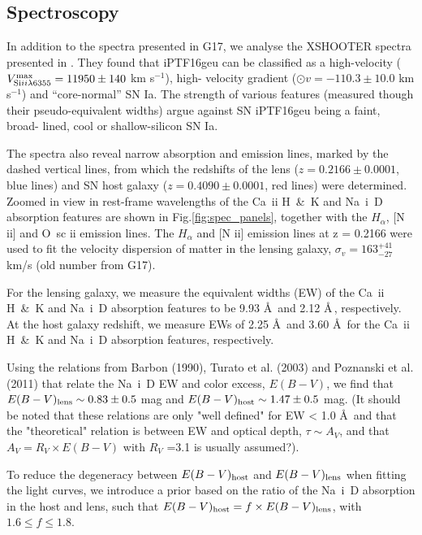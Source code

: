 \documentclass[a4paper,fleqn,usenatbib]{mnras}
\newcommand{\geu}{iPTF16geu\xspace}
\newcommand{\scipap}{G17\xspace}
\begin{document}
\subsection{Spectroscopy}
\label{ssec-spectroscopy}
In addition to the spectra presented in \scipap, we analyse the XSHOOTER spectra presented in \citet{2018MNRAS.473.4257C}. They found that \geu can be classified as a high-velocity ($V_{{\rm Si}{\sc ii} \lambda6355}^{\rm max} = 11950 \pm 140$ km s$^{-1}$), high- velocity gradient ($\odot{v} = -110.3 \pm 10.0$ km s$^{-1}$) and “core-normal” SN Ia. The strength of various features (measured though their pseudo-equivalent widths) argue against SN \geu being a faint, broad- lined, cool or shallow-silicon SN Ia.

The spectra also reveal narrow absorption and emission lines, marked by the dashed vertical lines, from which the redshifts of the lens ($z = 0.2166 \pm 0.0001$, blue lines) and SN host galaxy ($z = 0.4090 \pm 0.0001$, red lines) were determined. Zoomed in view in rest-frame wavelengths of the Ca~{\sc ii} H~\&~K and Na~{\sc i}~D absorption features are shown in Fig.\ref{fig:spec_panels}, together with the $H_{\alpha}$, [N {\sc ii}] and O~{sc ii} emission lines. The $H_{\alpha}$ and [N {\sc ii}] emission lines at z = 0.2166 were used to fit the velocity dispersion of matter in the lensing galaxy, $\sigma_v = 163^{+41}_{-27}$ km/s (old number from \scipap).

For the lensing galaxy, we measure the equivalent widths (EW) of the Ca~{\sc ii} H~\&~K and Na~{\sc i}~D absorption features to be 9.93 \AA \, and 2.12 \AA \,, respectively. At the host galaxy redshift, we measure EWs of 2.25 \AA \, and 3.60 \AA \, for the Ca~{\sc ii} H~\&~K and Na~{\sc i}~D absorption features, respectively.

Using the relations from Barbon (1990), Turato et al. (2003) and Poznanski et al. (2011) that relate the Na~{\sc i}~D EW and color excess, $E(B-V)$, we find that $E(B-V)_{\rm lens} \sim 0.83 \pm 0.5$ mag and $E(B-V)_{\rm host} \sim 1.47 \pm 0.5$ mag. (It should be noted that these relations are only "well defined" for EW < 1.0 \AA \, and that the "theoretical" relation is between EW and optical depth, $\tau \sim A_V$, and that $A_V = R_V \times E(B-V)$ with $R_V$ =3.1 is usually assumed?). 

To reduce the degeneracy between $E(B-V)_{\rm host}$ and $E(B-V)_{\rm lens}$ when fitting the light curves, we introduce a prior based on the ratio of the Na~{\sc i}~D absorption in the host and lens, such that $E(B-V)_{\rm host} = f \times E(B-V)_{\rm lens}$, with $1.6 \leq f \leq 1.8$.
\end{document}
